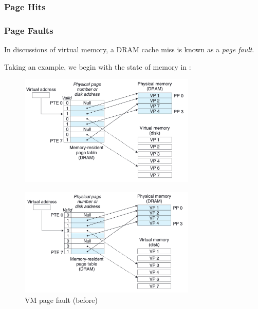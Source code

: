 \documentclass[12pt]{article}
\begin{document}
\subsubsection*{Page Hits}



\subsubsection*{Page Faults}

In discussions of virtual memory, a DRAM cache miss is known as a \textit{page fault}. 

Taking an example, we begin with the state of memory in :

\begin{figure}[H]
    \centering
    \includegraphics[width=0.75\textwidth]{graphics/Figure 4.5.png}
    \caption{}
    \label{fig:45}
\end{figure}



\begin{figure}[H]
    \centering
    \includegraphics[width=0.75\textwidth]{graphics/Figure 4.6.png}
    \caption{VM page fault (before)}
    \label{fig:46}
\end{figure}
\end{document}
